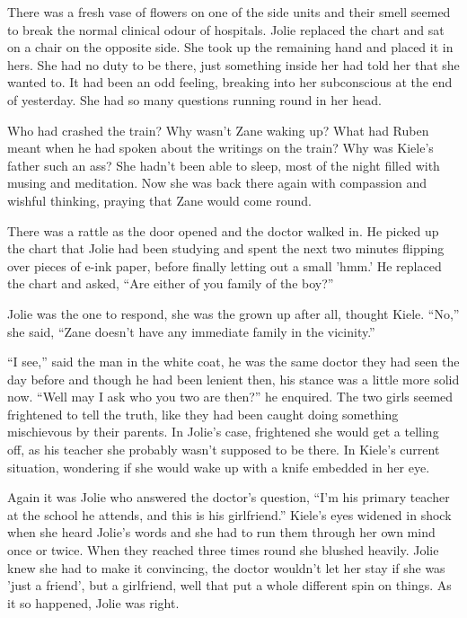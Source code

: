 There was a fresh vase of flowers on one of the side units and their smell seemed to break the normal clinical odour of hospitals.  Jolie replaced the chart and sat on a chair on the opposite side.  She took up the remaining hand and placed it in hers.  She had no duty to be there, just something inside her had told her that she wanted to.  It had been an odd feeling, breaking into her subconscious at the end of yesterday.  She had so many questions running round in her head.  

Who had crashed the train?  Why wasn't Zane waking up?  What had Ruben meant when he had spoken about the writings on the train?  Why was Kiele's father such an ass?  She hadn't been able to sleep, most of the night filled with musing and meditation.  Now she was back there again with compassion and wishful thinking, praying that Zane would come round.

There was a rattle as the door opened and the doctor walked in.  He picked up the chart that Jolie had been studying and spent the next two minutes flipping over pieces of e-ink paper, before finally letting out a small 'hmm.'  He replaced the chart and asked, ``Are either of you family of the boy?''

Jolie was the one to respond, she was the grown up after all, thought Kiele.  ``No,'' she said, ``Zane doesn't have any immediate family in the vicinity.''

``I see,'' said the man in the white coat, he was the same doctor they had seen the day before and though he had been lenient then, his stance was a little more solid now.  ``Well may I ask who you two are then?'' he enquired.  The two girls seemed frightened to tell the truth, like they had been caught doing something mischievous by their parents.  In Jolie's case, frightened she would get a telling off, as his teacher she probably wasn't supposed to be there.  In Kiele's current situation, wondering if she would wake up with a knife embedded in her eye.

Again it was Jolie who answered the doctor's question, ``I'm his primary teacher at the school he attends, and this is his girlfriend.''  Kiele's eyes widened in shock when she heard Jolie's words and she had to run them through her own mind once or twice.  When they reached three times round she blushed heavily.  Jolie knew she had to make it convincing, the doctor wouldn't let her stay if she was 'just a friend', but a girlfriend, well that put a whole different spin on things.  As it so happened, Jolie was right.

